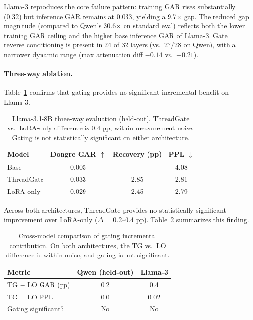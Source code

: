 \documentclass[11pt,a4paper]{article}
\begin{document}
Llama-3 reproduces the core failure pattern: training GAR rises substantially (0.32) but inference GAR remains at 0.033, yielding a 9.7$\times$ gap. The reduced gap magnitude (compared to Qwen's 30.6$\times$ on standard eval) reflects both the lower training GAR ceiling and the higher base inference GAR of Llama-3.
Gate reverse conditioning is present in 24 of 32 layers (vs.\ 27/28 on Qwen), with a narrower dynamic range (max attenuation diff $-0.14$ vs.\ $-0.21$).

\paragraph{Three-way ablation.}
Table~\ref{tab:llama_eval} confirms that gating provides no significant incremental benefit on Llama-3.

\begin{table}[t]
\centering
\caption{Llama-3.1-8B three-way evaluation (held-out). ThreadGate vs.\ LoRA-only difference is 0.4 pp, within measurement noise. Gating is not statistically significant on either architecture.}
\label{tab:llama_eval}
\begin{tabular}{lccc}
\toprule
\textbf{Model} & \textbf{Dongre GAR} $\uparrow$ & \textbf{Recovery (pp)} & \textbf{PPL} $\downarrow$ \\
\midrule
Base       & 0.005 & ---  & 4.08 \\
ThreadGate & 0.033 & 2.85 & 2.81 \\
LoRA-only  & 0.029 & 2.45 & 2.79 \\
\bottomrule
\end{tabular}
\end{table}

Across both architectures, ThreadGate provides no statistically significant improvement over LoRA-only ($\Delta$ = 0.2--0.4 pp). Table~\ref{tab:cross_gating} summarizes this finding.

\begin{table}[t]
\centering
\caption{Cross-model comparison of gating incremental contribution. On both architectures, the TG vs.\ LO difference is within noise, and gating is not significant.}
\label{tab:cross_gating}
\begin{tabular}{lcc}
\toprule
\textbf{Metric} & \textbf{Qwen (held-out)} & \textbf{Llama-3} \\
\midrule
TG $-$ LO GAR (pp) & 0.2  & 0.4 \\
TG $-$ LO PPL      & 0.0  & 0.02 \\
Gating significant? & No   & No \\
\bottomrule
\end{tabular}
\end{table}
\end{document}
